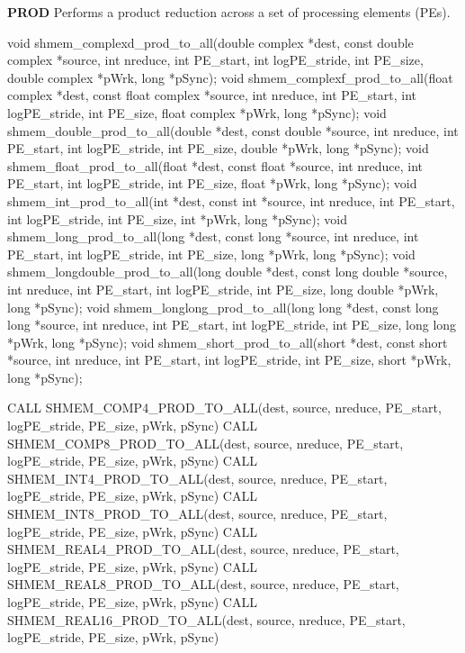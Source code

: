 \begin{apidefinition}
\bigskip
\textbf{PROD} \newline
Performs a product reduction across a set of processing elements (\ac{PE}s).\newline
\begin{Csynopsis}
void shmem_complexd_prod_to_all(double complex *dest, const double complex *source, int nreduce, int PE_start, int logPE_stride, int PE_size, double complex *pWrk, long *pSync);
void shmem_complexf_prod_to_all(float complex *dest, const float complex *source, int nreduce, int PE_start, int logPE_stride, int PE_size, float complex *pWrk, long *pSync);
void shmem_double_prod_to_all(double *dest, const double *source, int nreduce, int PE_start, int logPE_stride, int PE_size, double *pWrk, long *pSync);
void shmem_float_prod_to_all(float *dest, const float *source, int nreduce, int PE_start, int logPE_stride, int PE_size, float *pWrk, long *pSync);
void shmem_int_prod_to_all(int *dest, const int *source, int nreduce, int PE_start, int logPE_stride, int PE_size, int *pWrk, long *pSync);
void shmem_long_prod_to_all(long *dest, const long *source, int nreduce, int PE_start, int logPE_stride, int PE_size, long *pWrk, long *pSync);
void shmem_longdouble_prod_to_all(long double *dest, const long double *source, int nreduce, int PE_start, int logPE_stride, int PE_size, long double *pWrk, long *pSync);
void shmem_longlong_prod_to_all(long long *dest, const long long *source, int nreduce, int PE_start, int logPE_stride, int PE_size, long long *pWrk, long *pSync);
void shmem_short_prod_to_all(short *dest, const short *source, int nreduce, int PE_start, int logPE_stride, int PE_size, short *pWrk, long *pSync);
\end{Csynopsis}

\begin{Fsynopsis}
CALL SHMEM_COMP4_PROD_TO_ALL(dest, source, nreduce, PE_start, logPE_stride, PE_size, pWrk, pSync)
CALL SHMEM_COMP8_PROD_TO_ALL(dest, source, nreduce, PE_start, logPE_stride, PE_size, pWrk, pSync)
CALL SHMEM_INT4_PROD_TO_ALL(dest, source, nreduce, PE_start, logPE_stride, PE_size, pWrk, pSync)
CALL SHMEM_INT8_PROD_TO_ALL(dest, source, nreduce, PE_start, logPE_stride, PE_size, pWrk, pSync)
CALL SHMEM_REAL4_PROD_TO_ALL(dest, source, nreduce, PE_start, logPE_stride, PE_size, pWrk, pSync)
CALL SHMEM_REAL8_PROD_TO_ALL(dest, source, nreduce, PE_start, logPE_stride, PE_size, pWrk, pSync)
CALL SHMEM_REAL16_PROD_TO_ALL(dest, source, nreduce, PE_start, logPE_stride, PE_size, pWrk, pSync)
\end{Fsynopsis}


\end{apidefinition}
